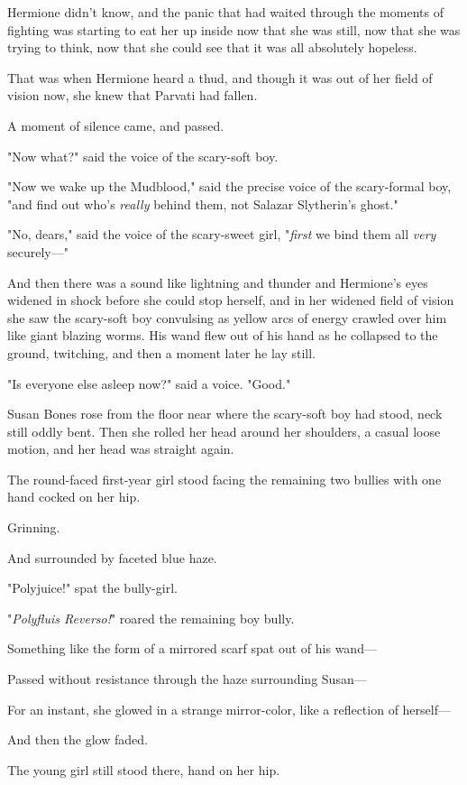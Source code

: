 Hermione didn't know, and the panic that had waited through the moments of
fighting was starting to eat her up inside now that she was still, now that she
was trying to think, now that she could see that it was all absolutely hopeless.

That was when Hermione heard a thud, and though it was out of her field of
vision now, she knew that Parvati had fallen.

A moment of silence came, and passed.

"Now what?" said the voice of the scary-soft boy.

"Now we wake up the Mudblood," said the precise voice of the scary-formal boy,
"and find out who's \emph{really} behind them, not Salazar Slytherin's ghost."

"No, dears," said the voice of the scary-sweet girl, "\emph{first} we bind them
all \emph{very} securely\mbox{---}"

And then there was a sound like lightning and thunder and Hermione's eyes
widened in shock before she could stop herself, and in her widened field of
vision she saw the scary-soft boy convulsing as yellow arcs of energy crawled
over him like giant blazing worms. His wand flew out of his hand as he
collapsed to the ground, twitching, and then a moment later he lay still.

"Is everyone else asleep now?" said a voice. "Good."

Susan Bones rose from the floor near where the scary-soft boy had stood, neck
still oddly bent. Then she rolled her head around her shoulders, a casual loose
motion, and her head was straight again.

The round-faced first-year girl stood facing the remaining two bullies with one
hand cocked on her hip.

Grinning.

And surrounded by faceted blue haze.

"Polyjuice!" spat the bully-girl.

"\emph{Polyfluis Reverso!}" roared the remaining boy bully.

Something like the form of a mirrored scarf spat out of his wand---

Passed without resistance through the haze surrounding Susan---

For an instant, she glowed in a strange mirror-color, like a reflection of
herself---

And then the glow faded.

The young girl still stood there, hand on her hip.

